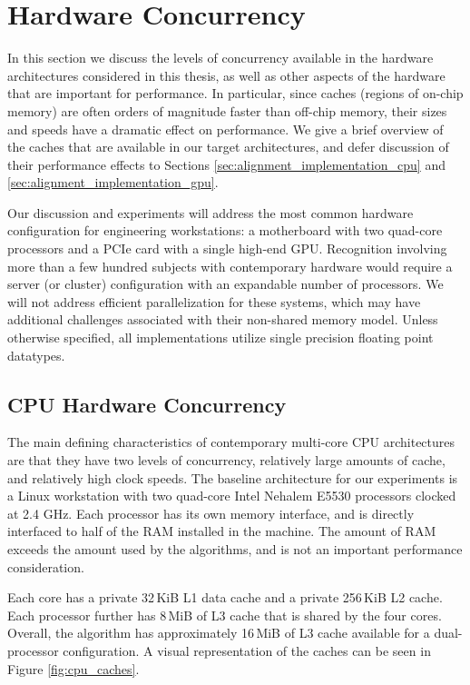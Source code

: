 \section{Hardware Concurrency} \label{sec:concurrency}
In this section we discuss the levels of concurrency available in the hardware
architectures considered in this thesis, as well as other aspects of the
hardware that are important for performance.  In particular, since caches
(regions of on-chip memory) are often orders of magnitude faster than off-chip
memory, their sizes and speeds have a dramatic effect on performance.  We give a
brief overview of the caches that are available in our target architectures,
and defer discussion of their performance effects to Sections
\ref{sec:alignment_implementation_cpu} and
\ref{sec:alignment_implementation_gpu}.

Our discussion and experiments will address the most common hardware
configuration for engineering workstations: a motherboard with two quad-core
processors and a PCIe card with a single high-end GPU.  
Recognition involving more than a few hundred subjects with contemporary hardware
would require a server (or cluster) configuration with an expandable 
number of processors.  We will not address efficient parallelization for 
these systems, which may have additional challenges associated with
their non-shared memory model.
Unless otherwise specified, all implementations utilize single precision
floating point datatypes.  

\subsection{CPU Hardware Concurrency}
\label{sec:CPU-concurrency}
The main defining characteristics of contemporary multi-core CPU architectures
are that they have two levels of concurrency, relatively large amounts of
cache, and relatively high clock speeds. The baseline architecture for our experiments 
is a Linux workstation with two
quad-core Intel Nehalem E5530 processors clocked at 2.4 GHz.  Each processor
has its own memory interface, and is directly interfaced to half of the RAM
installed in the machine.  The amount of RAM exceeds the amount used
by the algorithms, and is not an important performance consideration.  

Each core has a private 32\,KiB L1 data cache and a private 256\,KiB L2 cache.
Each processor further has 8\,MiB of L3 cache that is shared by the four cores.
Overall, the algorithm has approximately 16\,MiB of L3 cache
available for a dual-processor configuration.  
A visual representation of the caches can be seen in Figure \ref{fig:cpu_caches}.

